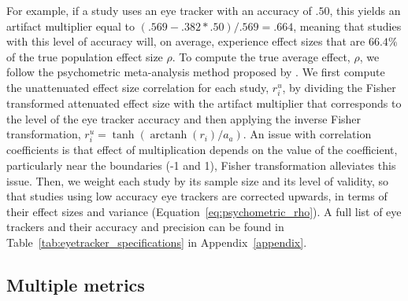 \documentclass{article}
\DeclareMathOperator\arctanh{arctanh}
\begin{document}
For example, if a study uses an eye tracker with an accuracy of $.50$, this yields an artifact multiplier equal to $(.569 - .382*.50)/.569 = .664$, meaning that studies with this level of accuracy will, on average, experience effect sizes that are $66.4\%$ of the true population effect size $\rho$. To compute the true average effect, $\rho$, we follow the psychometric meta-analysis method proposed by \cite{hunter2004a}. We first compute the unattenuated effect size correlation for each study, $r_i^u$, by dividing the Fisher transformed attenuated effect size with the artifact multiplier that corresponds to the level of the eye tracker accuracy and then applying the inverse Fisher transformation, $r_i^u = \tanh(\arctanh(r_i)/a_a)$. An issue with correlation coefficients is that effect of multiplication depends on the value of the coefficient, particularly near the boundaries (-1 and 1), Fisher transformation alleviates this issue. Then, we weight each study by its sample size and its level of validity, so that studies using low accuracy eye trackers are corrected upwards, in terms of their effect sizes and variance (Equation~\ref{eq:psychometric_rho}). A full list of eye trackers and their accuracy and precision can be found in Table~\ref{tab:eyetracker_specifications} in Appendix~\ref{appendix}.


\subsection{Multiple metrics}
\end{document}
